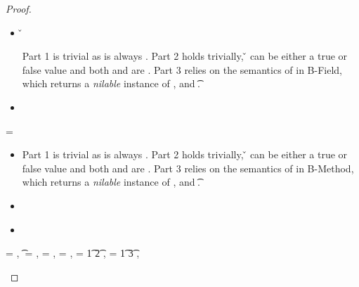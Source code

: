 \begin{lemma}
\begin{enumerate}
\begin{proof}
\begin{case}[T-FieldStatic]
\begin{itemize}
  \item[]
\begin{subcase}[B-Field]
  \opsem {\openv{}}
         {} 
         { {\classfieldpair{\fld{}} {\v{}}}}


Part 1 is trivial as \object{} is always \emptyobject{}.
Part 2 holds trivially, \v{} can be either a true or false value
and both {\thenprop{\prop{}}} and {\elseprop{\prop{}}}
are \topprop{}.
Part 3 relies on the semantics of \getfieldliteral 
in B-Field, which returns a \emph{nilable} instance of ,
and  {\t{}}.
\end{subcase}
  \item[]
\begin{subcase}[BE-Field]
\end{subcase}
\end{itemize}
\end{case}

\begin{case}[T-MethodStatic]
  \e{} = { 
                          {} 
                          {}
                          {\mth{}} {\e{}} {}}

\begin{itemize}
  \item[]
\begin{subcase}[B-Method]

Part 1 is trivial as \object{} is always \emptyobject{}.
Part 2 holds trivially, \v{} can be either a true or false value
and both {\thenprop{\prop{}}} and {\elseprop{\prop{}}}
are \topprop{}.
Part 3 relies on the semantics of \invokejavamethodliteral 
in B-Method, which returns a \emph{nilable} instance of ,
and  {\t{}}.
\end{subcase}
  \item[]
\begin{subcase}[BE-Method1]
\end{subcase}
  \item[]
\begin{subcase}[BE-Method2]
\end{subcase}
\end{itemize}

\end{case}

\begin{case}[T-DefMulti]
  \e{} = {\createmultiexp {\s{}} {}},
  \t{} = {\MultiFntype {\s{}} {\sp{}}},
  \thenprop{\prop{}} = {\topprop{}},
  \elseprop{\prop{}} = {\botprop{}},
  \s{} = {\ArrowOne {\x{}} {\t{1}} {\t{2}}
                          {
                                      {}}
                          {}},
  \sp{} = {\ArrowOne {\x{}} {\t{1}} {\t{3}}
                          {
                                      {}}
                          {}},
  \judgementtwo {\propenv{}} { {\sp{}}}



\end{case}
\end{proof}
\end{enumerate}
\end{lemma}
